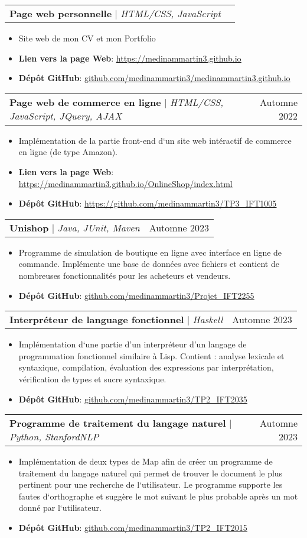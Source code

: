 \documentclass[letterpaper,11pt]{article}
\makeatletter
\newcommand{\resumeItem}[1]{
  \item\small{
    {#1 \vspace{-2pt}}
  }
}
\newcommand{\resumeProjectHeading}[2]{
    \item
    \begin{tabular*}{0.97\textwidth}{l@{\extracolsep{\fill}}r}
      \small#1 & #2 \\
    \end{tabular*}\vspace{-7pt}
}
\newcommand{\resumeItemListStart}{\begin{itemize}}
\newcommand{\resumeItemListEnd}{\end{itemize}\vspace{-5pt}}
\makeatother
\begin{document}
          \resumeProjectHeading
          {\textbf{Page web personnelle} $|$ \emph{HTML/CSS, JavaScript}}{}
          \resumeItemListStart
            \resumeItem{Site web de mon CV et mon Portfolio}
            \resumeItem{\textbf{Lien vers la page Web}: \href{https://medinammartin3.github.io}{\underline{https://medinammartin3.github.io}}}
            \resumeItem{\textbf{Dépôt GitHub}: \href{https://github.com/medinammartin3/medinammartin3.github.io}{\underline{github.com/medinammartin3/medinammartin3.github.io}}}
          \resumeItemListEnd

          \resumeProjectHeading
          {\textbf{Page web de commerce en ligne} $|$ \emph{HTML/CSS, JavaScript, JQuery, AJAX}}{Automne 2022}
          \resumeItemListStart
            \resumeItem{Implémentation de la partie front-end d‘un site web intéractif de commerce en ligne (de type Amazon).}
            \resumeItem{\textbf{Lien vers la page Web}: \href{https://medinammartin3.github.io/OnlineShop/index.html}{\underline{https://medinammartin3.github.io/OnlineShop/index.html}}}
            \resumeItem{\textbf{Dépôt GitHub}: \href{https://github.com/medinammartin3/TP3_IFT1005}{\underline{https://github.com/medinammartin3/TP3\_IFT1005}}}
          \resumeItemListEnd

          \resumeProjectHeading
          {\textbf{Unishop} $|$ \emph{Java, JUnit, Maven}}{Automne 2023}
          \resumeItemListStart
            \resumeItem{Programme de simulation de boutique en ligne avec interface en ligne de commande. Implémente une base de données avec fichiers et contient de nombreuses fonctionnalités pour les acheteurs et vendeurs.}
            \resumeItem{\textbf{Dépôt GitHub}: \href{https://github.com/medinammartin3/Projet_IFT2255}{\underline{github.com/medinammartin3/Projet\_IFT2255}}}
          \resumeItemListEnd

          \resumeProjectHeading
          {\textbf{Interpréteur de language fonctionnel} $|$ \emph{Haskell}}{Automne 2023}
          \resumeItemListStart
            \resumeItem{Implémentation d‘une partie d’un interpréteur d’un langage de programmation fonctionnel similaire à Lisp. Contient : analyse lexicale et syntaxique, compilation, évaluation des expressions par interprétation, vérification de types et sucre syntaxique.}
            \resumeItem{\textbf{Dépôt GitHub}: \href{https://github.com/medinammartin3/TP2_IFT2035}{\underline{github.com/medinammartin3/TP2\_IFT2035}}}
          \resumeItemListEnd

          \resumeProjectHeading
          {\textbf{Programme de traitement du langage naturel} $|$ \emph{Python, StanfordNLP}}{Automne 2023}
          \resumeItemListStart
            \resumeItem{Implémentation de deux types de Map afin de créer un programme de traitement du langage naturel qui permet de trouver le document le plus pertinent pour une recherche de l‘utilisateur. Le programme supporte les fautes d‘orthographe et suggère le mot suivant le plus probable après un mot donné par l‘utilisateur.}
            \resumeItem{\textbf{Dépôt GitHub}: \href{https://github.com/medinammartin3/TP2_IFT2015}{\underline{github.com/medinammartin3/TP2\_IFT2015}}}
          \resumeItemListEnd
\end{document}
